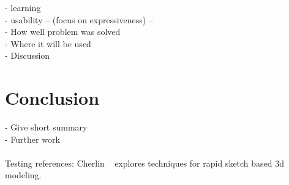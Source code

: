 \documentclass[a4paper,12pt]{report}
\begin{document}
- learning\\
- usability
 -- (focus on expressiveness) -- \\
- How well problem was solved\\
- Where it will be used \\
- Discussion

\clearpage
\chapter{Conclusion}
\label{sec:conclusion}
- Give short summary\\
- Further work\\
\\


Testing references: Cherlin ~\cite{Cherlin:2005:SMF:1090122.1090145} explores techniques for rapid sketch based 3d modeling.


{}

\end{document}
